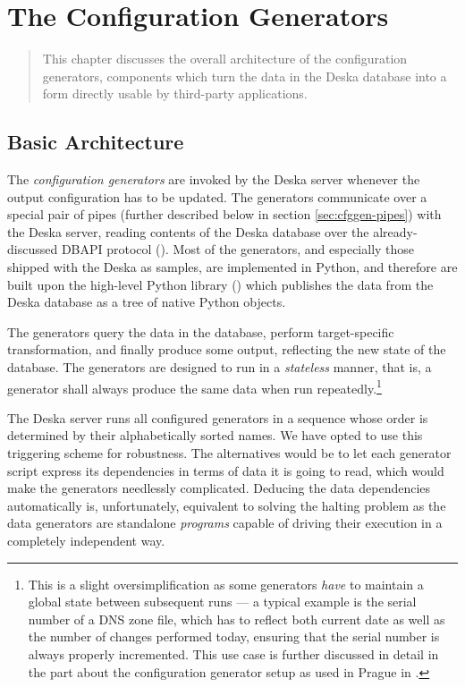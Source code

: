 \documentclass[deska]{subfiles}
\begin{document}
\chapter{The Configuration Generators}
\label{sec:config-generators}

\begin{abstract}
This chapter discusses the overall architecture of the configuration generators, components which turn the data in the
Deska database into a form directly usable by third-party applications.
\end{abstract}

\section{Basic Architecture}

The {\em configuration generators} are invoked by the Deska server whenever the output configuration has to be updated.
The generators communicate over a special pair of pipes (further described below in section \ref{sec:cfggen-pipes})
with the Deska server, reading contents of the Deska database over the already-discussed DBAPI protocol
().  Most of the generators, and especially those shipped with the Deska as samples, are
implemented in Python, and therefore are built upon the high-level Python library () which
publishes the data from the Deska database as a tree of native Python objects.

The generators query the data in the database, perform target-specific transformation, and finally produce some output,
reflecting the new state of the database.  The generators are designed to run in a {\em stateless} manner, that is, a
generator shall always produce the same data when run repeatedly.\footnote{This is a slight oversimplification as some
generators {\em have} to maintain a global state between subsequent runs --- a typical example is the serial number of a
DNS zone file, which has to reflect both current date as well as the number of changes performed today, ensuring that
the serial number is always properly incremented.  This use case is further discussed in detail in the part about the
configuration generator setup as used in Prague in .}

The Deska server runs all configured generators in a sequence whose order is determined by their alphabetically sorted
names.  We have opted to use this triggering scheme for robustness.  The alternatives would be to let each generator
script express its dependencies in terms of data it is going to read, which would make the generators needlessly
complicated.  Deducing the data dependencies automatically is, unfortunately, equivalent to solving the halting problem
as the data generators are standalone {\em programs} capable of driving their execution in a completely independent way.
\end{document}

